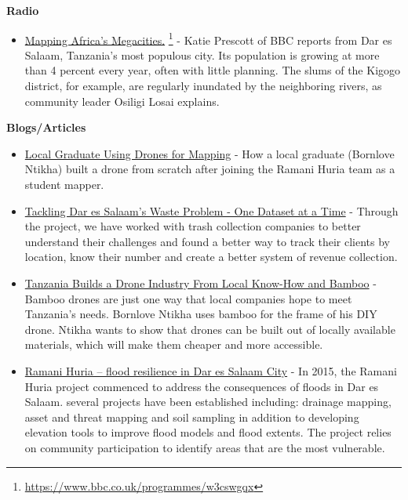 \documentclass[a4paper,12pt,twoside]{article}
\begin{document}
\newpage
\textbf{Radio}

	\begin{itemize}
		\item \href{https://www.bbc.co.uk/programmes/w3cswgqx}{Mapping Africa's Megacities.} \footnote{\url{https://www.bbc.co.uk/programmes/w3cswgqx}}
		- Katie Prescott of BBC reports from Dar es Salaam, Tanzania's most populous city. Its population is growing at more than 4 percent every year, often with little planning. The slums of the  Kigogo district, for example, are regularly inundated by the neighboring rivers, as community leader Osiligi Losai explains.
	\end{itemize}

\textbf{Blogs/Articles}

	\begin{itemize}
		\item \href{https://www.thecitizen.co.tz/magazine/success/-Local-graduate-using-drones-for-mapping/1843788-4967500-c6pj0rz/index.html}{Local Graduate Using Drones for Mapping}
		- How a local graduate (Bornlove Ntikha) built a drone from scratch after joining the Ramani Huria team as a student mapper.
		\item \href{https://www.ippmedia.com/en/features/hot-tackles-dar-es-salaamE28099s-waste-problem-one-dataset-time}{Tackling Dar es Salaam’s Waste Problem - One Dataset at a Time} 
		- Through the project, we have worked with trash collection companies to better understand their challenges and found a better way to track their clients by location, know their number and create a better system of revenue collection.
		\item \href{https://spectrum.ieee.org/robotics/drones/tanzanias-homegrown-drone-industry-takes-off-on-bamboo-wings}{ Tanzania Builds a Drone Industry From Local Know-How and Bamboo}
		- Bamboo drones are just one way that local companies hope to meet Tanzania’s needs. Bornlove Ntikha uses bamboo for the frame of his DIY drone. Ntikha wants to show that drones can be built out of locally available materials, which will make them cheaper and more accessible.
		\item {\href{https://use.metropolis.org/case-studies/ramani-huria#casestudydetail}{Ramani Huria – flood resilience in Dar es Salaam City}}
		- In 2015, the Ramani Huria project commenced to address the consequences of floods in Dar es Salaam. several projects have been established including: drainage mapping, asset and threat mapping and soil sampling in addition to developing elevation tools to improve flood models and flood extents. The project relies on community participation to identify areas that are the most vulnerable.
	\end{itemize}
\end{document}
